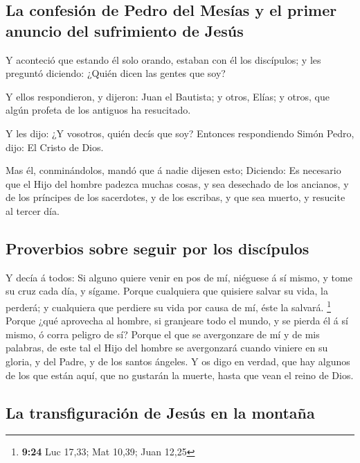 \hypertarget{la-confesiuxf3n-de-pedro-del-mesuxedas-y-el-primer-anuncio-del-sufrimiento-de-jesuxfas}{%
\subsection{La confesión de Pedro del Mesías y el primer anuncio del
sufrimiento de
Jesús}\label{la-confesiuxf3n-de-pedro-del-mesuxedas-y-el-primer-anuncio-del-sufrimiento-de-jesuxfas}}

 Y aconteció que estando él solo orando, estaban con él los
discípulos; y les preguntó diciendo: ¿Quién dicen las gentes que soy?

 Y ellos respondieron, y dijeron: Juan el Bautista; y
otros, Elías; y otros, que algún profeta de los antiguos ha resucitado.

 Y les dijo: ¿Y vosotros, quién decís que soy? Entonces
respondiendo Simón Pedro, dijo: El Cristo de Dios.

 Mas él, conminándolos, mandó que á nadie dijesen esto;
 Diciendo: Es necesario que el Hijo del hombre padezca
muchas cosas, y sea desechado de los ancianos, y de los príncipes de los
sacerdotes, y de los escribas, y que sea muerto, y resucite al tercer
día.

\hypertarget{proverbios-sobre-seguir-por-los-discuxedpulos}{%
\subsection{Proverbios sobre seguir por los
discípulos}\label{proverbios-sobre-seguir-por-los-discuxedpulos}}

 Y decía á todos: Si alguno quiere venir en pos de mí,
niéguese á sí mismo, y tome su cruz cada día, y sígame. 
Porque cualquiera que quisiere salvar su vida, la perderá; y cualquiera
que perdiere su vida por causa de mí, éste la salvará. \footnote{\textbf{9:24}
  Luc 17,33; Mat 10,39; Juan 12,25}  Porque ¿qué aprovecha
al hombre, si granjeare todo el mundo, y se pierda él á sí mismo, ó
corra peligro de sí?  Porque el que se avergonzare de mí y
de mis palabras, de este tal el Hijo del hombre se avergonzará cuando
viniere en su gloria, y del Padre, y de los santos ángeles.
 Y os digo en verdad, que hay algunos de los que están
aquí, que no gustarán la muerte, hasta que vean el reino de Dios.

\hypertarget{la-transfiguraciuxf3n-de-jesuxfas-en-la-montauxf1a}{%
\subsection{La transfiguración de Jesús en la
montaña}\label{la-transfiguraciuxf3n-de-jesuxfas-en-la-montauxf1a}}

